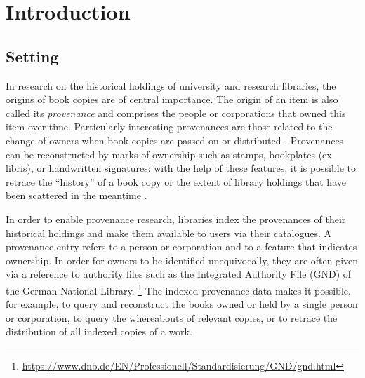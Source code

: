 \chapter{Introduction}
\label{chap:intro}

\section{Setting}
\label{sec:setting}

In research on the historical holdings of university and research libraries,
the origins of book copies are of central importance.
The origin of an item is also called its \emph{provenance} 
and comprises the people or corporations that owned this item over time.
Particularly interesting provenances are those related to the change of
owners when book copies are passed on or distributed \autocite[p.\,2]{Hakelberg2016}.
Provenances can be reconstructed by marks of ownership
such as stamps, bookplates (ex libris), or handwritten signatures:
with the help of these features, it is possible to retrace
the ``history'' of a book copy
or the extent of library holdings that have been scattered in the meantime \autocite[p.\,2]{Hakelberg2016}.

In order to enable provenance research,
libraries index the provenances of their historical holdings
and make them available to users via their catalogues.
A provenance entry refers to a person or corporation
and to a feature that indicates ownership.
In order for owners to be identified unequivocally,
they are often given via a reference to authority files such as the
Integrated Authority File (GND) of the German National Library.%
\footnote{%
  \url{https://www.dnb.de/EN/Professionell/Standardisierung/GND/gnd.html}%
}
The indexed provenance data makes it possible, for example,
to query and reconstruct the books owned or held by a single person or corporation,
to query the whereabouts of relevant copies,
or to retrace the distribution of all indexed copies of a work.

